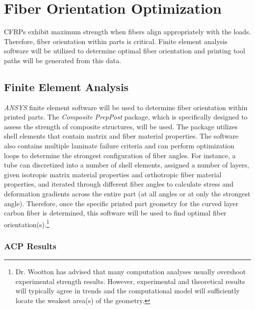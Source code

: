 \section{Fiber Orientation Optimization}

\indent

CFRPs exhibit maximum strength when fibers align appropriately with the loads. Therefore, fiber orientation within parts is critical. Finite element analysis software will be utilized to determine optimal fiber orientation and printing tool paths will be generated from this data.

\subsection{Finite Element Analysis}

\indent

\emph{ANSYS} finite element software will be used to determine fiber orientation within printed parts. The \emph{Composite PrepPost} package, which is specifically designed to assess the strength of composite structures, will be used. The package utilizes shell elements that contain matrix and fiber material properties. The software also contains multiple laminate failure criteria and can perform optimization loops to determine the strongest configuration of fiber angles. For instance, a tube can discretized into a number of shell elements, assigned a number of layers, given isotropic matrix material properties and orthotropic fiber material properties, and iterated through different fiber angles to calculate stress and deformation gradients across the entire part (at all angles or at only the strongest angle). Therefore, once the specific printed part geometry for the curved layer carbon fiber is determined, this software will be used to find optimal fiber orientation(s).\footnote{Dr. Wootton has advised that many computation analyses usually overshoot experimental strength results. However, experimental and theoretical results will typically agree in trends and the computational model will sufficiently locate the weakest area(s) of the geometry.}\\

\subsubsection{ACP Results}


